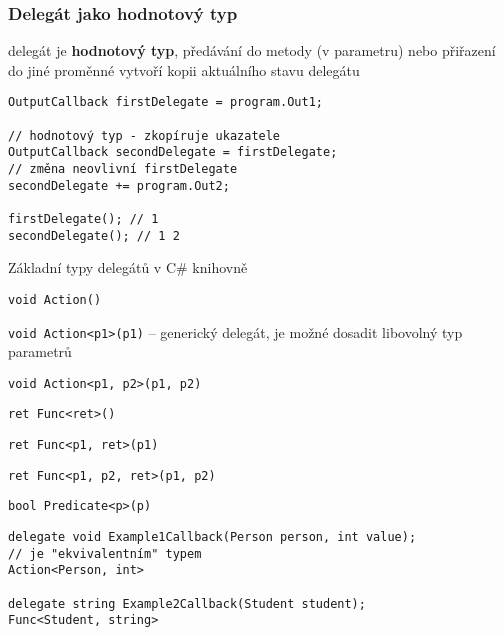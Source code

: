 \begin{frame}[fragile]
\frametitle{Delegát jako hodnotový typ}
\vfill
\begin{bitemize}{}
\item delegát je \textbf{hodnotový typ}, předávání do metody (v parametru) nebo přiřazení do jiné proměnné vytvoří kopii aktuálního stavu delegátu
\end{bitemize}
\vfill
\begin{yesblock}
\begin{lstlisting}
OutputCallback firstDelegate = program.Out1;

// hodnotový typ - zkopíruje ukazatele
OutputCallback secondDelegate = firstDelegate;
// změna neovlivní firstDelegate
secondDelegate += program.Out2;

firstDelegate(); // 1
secondDelegate(); // 1 2
\end{lstlisting}
\end{yesblock}
\vfill
\end{frame}





\begin{frame}[fragile]
\begin{bitemize}{Základní typy delegátů v C\# knihovně}
\item \lstinline|void Action()|
\item \lstinline|void Action<p1>(p1)| -- generický delegát, je možné dosadit libovolný typ parametrů
\item \lstinline|void Action<p1, p2>(p1, p2)|
\item \lstinline|ret Func<ret>()|
\item \lstinline|ret Func<p1, ret>(p1)|
\item \lstinline|ret Func<p1, p2, ret>(p1, p2)|
\item \lstinline|bool Predicate<p>(p)|
\end{bitemize}

\vfill

\begin{yesblock}
\begin{lstlisting}
delegate void Example1Callback(Person person, int value);
// je "ekvivalentním" typem
Action<Person, int>

delegate string Example2Callback(Student student);
Func<Student, string>
\end{lstlisting}
\end{yesblock}
\end{frame}





